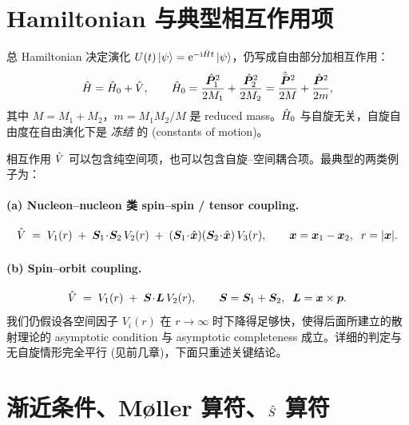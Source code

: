 \section{Hamiltonian 与典型相互作用项}\label{sec:hamiltonian-spin}

总 Hamiltonian 决定演化 $U(t)\ket\psi=\mathrm{e}^{-\mathrm{i}\hat{H} t}\ket\psi$，仍写成自由部分加相互作用：
\begin{equation}
  \hat{H} = \hat{H}_0 + \hat{V},\qquad
  \hat{H}_0=\frac{\hat{\bm P}_1^2}{2M_1}+\frac{\hat{\bm P}_2^2}{2M_2}=\frac{\hat{\bar{\bm P}}^2}{2M}+\frac{\hat{\bm P}^2}{2m},
  \label{eq:H0-spin}
\end{equation}
其中 $M=M_1+M_2$，$m=M_1 M_2/M$ 是 reduced mass。$\hat{H}_0$ 与自旋无关，自旋自由度在自由演化下是 \emph{冻结} 的 (constants of motion)。

相互作用 $\hat{V}$ 可以包含纯空间项，也可以包含自旋--空间耦合项。最典型的两类例子为：

\paragraph{(a) Nucleon--nucleon 类 spin--spin / tensor coupling.}
\begin{equation}
  \hat{V} \;=\; V_1(r)\;+\;\bm S_1\!\cdot\!\bm S_2\,V_2(r)\;+\;(\bm S_1\!\cdot\!\hat{\bm x})(\bm S_2\!\cdot\!\hat{\bm x})\,V_3(r),
  \qquad \bm x=\bm x_1-\bm x_2,\;\; r=|\bm x|.
  \label{eq:VNN}
\end{equation}

\paragraph{(b) Spin--orbit coupling.}
\begin{equation}
  \hat{V} \;=\; V_1(r)\;+\;\bm S\!\cdot\!\bm L\,V_2(r),\qquad \bm S=\bm S_1+\bm S_2,\;\; \bm L=\bm x\times\bm p.
  \label{eq:VSO}
\end{equation}
我们仍假设各空间因子 $V_i(r)$ 在 $r\to\infty$ 时下降得足够快，使得后面所建立的散射理论的 asymptotic condition 与 asymptotic completeness 成立。详细的判定与无自旋情形完全平行 (见前几章)，下面只重述关键结论。

\section{渐近条件、Møller 算符、$\hat{S}$ 算符}\label{sec:moller-spin}

